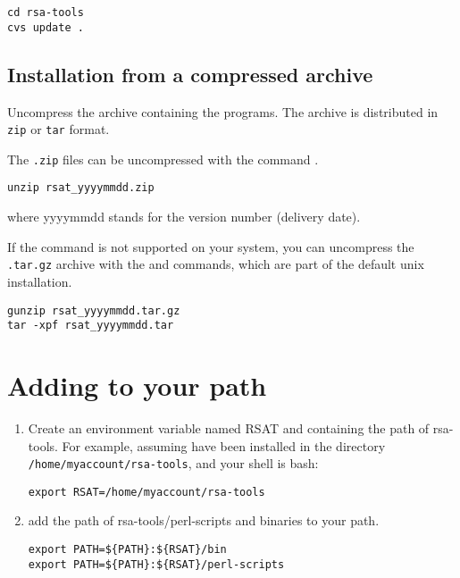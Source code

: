 \documentclass{article}
\begin{document}
\begin{verbatim}
cd rsa-tools
cvs update .
\end{verbatim}

\subsection{Installation from a compressed archive}

Uncompress the archive containing the programs. The archive is
distributed in \texttt{zip} or \texttt{tar} format.

The \texttt{.zip} files can be uncompressed with the command
.

\begin{verbatim}
unzip rsat_yyyymmdd.zip
\end{verbatim}
where yyyymmdd stands for the version number (delivery date).

If the  command is not supported on your system, you
can uncompress the \texttt{.tar.gz} archive with the 
and  commands, which are part of the default unix
installation.

\begin{verbatim}
gunzip rsat_yyyymmdd.tar.gz
tar -xpf rsat_yyyymmdd.tar
\end{verbatim}



\section{Adding \RSAT to your path}

\begin{enumerate}

\item Create an environment variable named RSAT and containing the
path of rsa-tools. For example, assuming \RSAT have been installed in
the directory \texttt{/home/myaccount/rsa-tools}, and your shell is
bash:

\begin{verbatim}
export RSAT=/home/myaccount/rsa-tools
\end{verbatim}

\item add the path of rsa-tools/perl-scripts and binaries to your path.

\begin{verbatim}
export PATH=${PATH}:${RSAT}/bin
export PATH=${PATH}:${RSAT}/perl-scripts
\end{verbatim}

\end{enumerate}
\end{document}

